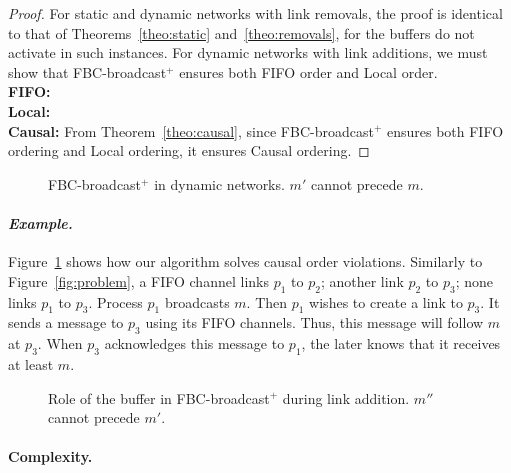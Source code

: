 \begin{proof}
  For static and dynamic networks with link removals, the proof is identical to
  that of Theorems~\ref{theo:static} and~\ref{theo:removals}, for the buffers do
  not activate in such instances. For dynamic networks with link additions, we
  must show that FBC-broadcast$^+$ ensures both
  FIFO order and Local order. \\
  \textbf{FIFO:}  \\
  \textbf{Local:}  \\
  \textbf{Causal:} From Theorem~\ref{theo:causal}, since FBC-broadcast$^+$
  ensures both FIFO ordering and Local ordering, it ensures Causal ordering.
\end{proof}

\begin{figure}
  \begin{center}
    
    \caption{\label{fig:solved}FBC-broadcast$^+$ in dynamic networks. $m'$
      cannot precede $m$.}
  \end{center}
\end{figure}

\paragraph{\emph{Example.}} Figure~\ref{fig:solved} shows how our algorithm solves
causal order violations. Similarly to Figure~\ref{fig:problem}, a FIFO channel
links $p_1$ to $p_2$; another link $p_2$ to $p_3$; none links $p_1$ to
$p_3$. Process $p_1$ broadcasts $m$. Then $p_1$ wishes to create a link to
$p_3$. It sends a message to $p_3$ using its FIFO channels. Thus, this message
will follow $m$ at $p_3$. When $p_3$ acknowledges this message to $p_1$, the
later knows that it receives at least $m$. 


\begin{figure}
  \begin{center}
    
    \caption{\label{fig:buffer}Role of the buffer in FBC-broadcast$^+$ during
      link addition. $m''$ cannot precede $m'$. }
  \end{center}
\end{figure}

\paragraph{Complexity.} 

